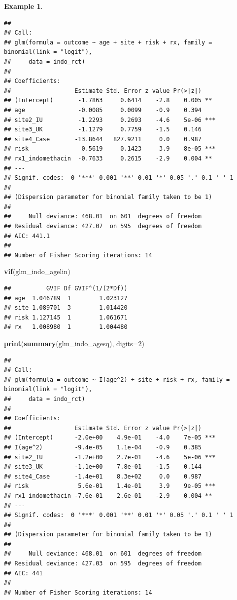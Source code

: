 \documentclass[
  openany]{book}
\newenvironment{Shaded}{\begin{snugshade}}{\end{snugshade}}
\newcommand{\AttributeTok}[1]{\textcolor[rgb]{0.13,0.29,0.53}{#1}}
\newcommand{\DecValTok}[1]{\textcolor[rgb]{0.00,0.00,0.81}{#1}}
\newcommand{\FunctionTok}[1]{\textcolor[rgb]{0.13,0.29,0.53}{\textbf{#1}}}
\newcommand{\NormalTok}[1]{#1}
\theoremstyle{definition}
\theoremstyle{definition}
\newtheorem{example}{Example}[chapter]
\theoremstyle{definition}
\theoremstyle{definition}
\theoremstyle{remark}
\begin{document}
\begin{example}
\begin{verbatim}
## 
## Call:
## glm(formula = outcome ~ age + site + risk + rx, family = binomial(link = "logit"), 
##     data = indo_rct)
## 
## Coefficients:
##                  Estimate Std. Error z value Pr(>|z|)    
## (Intercept)       -1.7863     0.6414    -2.8    0.005 ** 
## age               -0.0085     0.0099    -0.9    0.394    
## site2_IU          -1.2293     0.2693    -4.6    5e-06 ***
## site3_UK          -1.1279     0.7759    -1.5    0.146    
## site4_Case       -13.8644   827.9211     0.0    0.987    
## risk               0.5619     0.1423     3.9    8e-05 ***
## rx1_indomethacin  -0.7633     0.2615    -2.9    0.004 ** 
## ---
## Signif. codes:  0 '***' 0.001 '**' 0.01 '*' 0.05 '.' 0.1 ' ' 1
## 
## (Dispersion parameter for binomial family taken to be 1)
## 
##     Null deviance: 468.01  on 601  degrees of freedom
## Residual deviance: 427.07  on 595  degrees of freedom
## AIC: 441.1
## 
## Number of Fisher Scoring iterations: 14
\end{verbatim}

\begin{Shaded}
\begin{Highlighting}[]
\FunctionTok{vif}\NormalTok{(glm\_indo\_agelin)}
\end{Highlighting}
\end{Shaded}

\begin{verbatim}
##          GVIF Df GVIF^(1/(2*Df))
## age  1.046789  1        1.023127
## site 1.089701  3        1.014420
## risk 1.127145  1        1.061671
## rx   1.008980  1        1.004480
\end{verbatim}

\begin{Shaded}
\begin{Highlighting}[]
\FunctionTok{print}\NormalTok{(}\FunctionTok{summary}\NormalTok{(glm\_indo\_agesq), }\AttributeTok{digits=}\DecValTok{2}\NormalTok{)}
\end{Highlighting}
\end{Shaded}

\begin{verbatim}
## 
## Call:
## glm(formula = outcome ~ I(age^2) + site + risk + rx, family = binomial(link = "logit"), 
##     data = indo_rct)
## 
## Coefficients:
##                  Estimate Std. Error z value Pr(>|z|)    
## (Intercept)      -2.0e+00    4.9e-01    -4.0    7e-05 ***
## I(age^2)         -9.4e-05    1.1e-04    -0.9    0.385    
## site2_IU         -1.2e+00    2.7e-01    -4.6    5e-06 ***
## site3_UK         -1.1e+00    7.8e-01    -1.5    0.144    
## site4_Case       -1.4e+01    8.3e+02     0.0    0.987    
## risk              5.6e-01    1.4e-01     3.9    9e-05 ***
## rx1_indomethacin -7.6e-01    2.6e-01    -2.9    0.004 ** 
## ---
## Signif. codes:  0 '***' 0.001 '**' 0.01 '*' 0.05 '.' 0.1 ' ' 1
## 
## (Dispersion parameter for binomial family taken to be 1)
## 
##     Null deviance: 468.01  on 601  degrees of freedom
## Residual deviance: 427.03  on 595  degrees of freedom
## AIC: 441
## 
## Number of Fisher Scoring iterations: 14
\end{verbatim}


\end{example}
\end{document}
